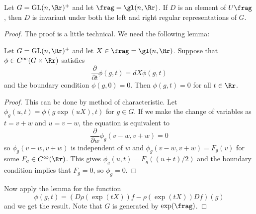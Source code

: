\begin{theorem}
\label{center}
Let $G = \GL(n, \Rr)^{+}$ and let $\frag = \gl(n, \Rr)$. If $D$ is an element of $U\frag$, then $D$ is invariant under both the left and right regular representations of $G$. 
\end{theorem}
\begin{proof}
The proof is a little technical. We need the following lemma:
\begin{lemma}
Let $G = \GL(n, \Rr)^{+}$ and let $X\in \frag = \gl(n, \Rr)$. Suppose that $\phi\in C^{\infty}(G\times \Rr)$ satisfies 
$$
\frac{\partial}{\partial t} \phi(g, t) = dX \phi(g, t)
$$
and the boundary condition $\phi(g, 0) = 0$. Then $\phi(g, t) = 0$ for all $t\in \Rr$. 
\end{lemma}
\begin{proof}
This can be done by method of characteristic. Let $\phi_{g}(u, t) = \phi(g \exp(uX),t)$ for $g\in G$. If we make the change of variables as $t = v + w$ and $u = v-w$, the equation is equivalent to 
$$
\frac{\partial}{\partial w}\phi_{g}(v-w, v+w) = 0
$$
so $\phi_{g}(v-w, v+w)$ is independent of $w$ and $\phi_{g}(v-w, v+w) = F_{g}(v)$ for some $F_{g}\in C^{\infty}(\Rr)$. This gives $\phi_{g}(u, t) = F_{g}((u+t)/2)$ and the boundary condition implies that $F_{g} = 0$, so $\phi_{g} = 0$. 
\end{proof}
Now apply the lemma for the function
$$
\phi(g, t) = (D\rho(\exp(tX))f - \rho(\exp(tX))Df)(g)
$$
and we get the result. Note that $G$ is generated by $\exp(\frag)$.
\end{proof}

